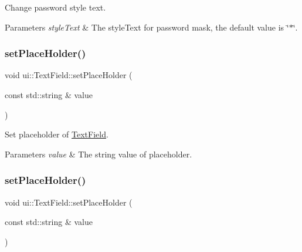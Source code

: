 Change password style text. 


\begin{DoxyParams}{Parameters}
{\em style\+Text} & The style\+Text for password mask, the default value is \char`\"{}$\ast$\char`\"{}. \\
\hline
\end{DoxyParams}
\mbox{\label{classui_1_1TextField_a6b31c82b05591b783f1a0f6e1cbc5802}} 
\subsubsection{\texorpdfstring{set\+Place\+Holder()}{setPlaceHolder()}\hspace{0.1cm}{\footnotesize\ttfamily [1/2]}}
{\footnotesize\ttfamily void ui\+::\+Text\+Field\+::set\+Place\+Holder (\begin{DoxyParamCaption}\item[{const std\+::string \&}]{value }\end{DoxyParamCaption})}



Set placeholder of \hyperlink{classui_1_1TextField}{Text\+Field}. 


\begin{DoxyParams}{Parameters}
{\em value} & The string value of placeholder. \\
\hline
\end{DoxyParams}
\mbox{\label{classui_1_1TextField_a6b31c82b05591b783f1a0f6e1cbc5802}} 
\subsubsection{\texorpdfstring{set\+Place\+Holder()}{setPlaceHolder()}\hspace{0.1cm}{\footnotesize\ttfamily [2/2]}}
{\footnotesize\ttfamily void ui\+::\+Text\+Field\+::set\+Place\+Holder (\begin{DoxyParamCaption}\item[{const std\+::string \&}]{value }\end{DoxyParamCaption})}



